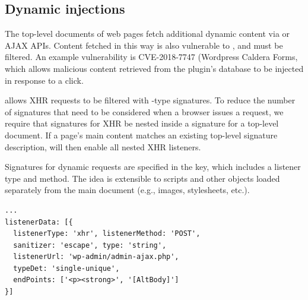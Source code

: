 \subsection{Dynamic injections} \label{dynamic_injections}

The top-level documents of web pages fetch additional dynamic content
via  or AJAX APIs. Content fetched in
this way is also vulnerable to \xss, and must be filtered. An example
vulnerability is CVE-2018-7747 (Wordpress Caldera Forms, which allows malicious
content retrieved from the plugin's database to be injected in response to a click.

\sys allows XHR requests to be filtered with -type
signatures. To reduce the number of signatures that need to be
considered when a browser issues a request, we require that signatures
for XHR be nested inside a signature for a top-level document. If a
page's main content matches an existing top-level signature description,
\sys will then enable all nested XHR listeners.

Signatures for dynamic requests are specified in the 
key, which includes a listener type and method. The idea is extensible
to scripts and other objects loaded separately from the main document
(e.g., images, stylesheets, etc.).

\lstset{basicstyle=\small}
\begin{lstlisting}[breaklines=true,caption={
      An example dynamic request signature. This patches CVE-2018-7747.
    },label={lst:dynamic_signature}]
...
listenerData: [{
  listenerType: 'xhr', listenerMethod: 'POST',
  sanitizer: 'escape', type: 'string',
  listenerUrl: 'wp-admin/admin-ajax.php',
  typeDet: 'single-unique',
  endPoints: ['<p><strong>', '[AltBody]']
}]
\end{lstlisting}

